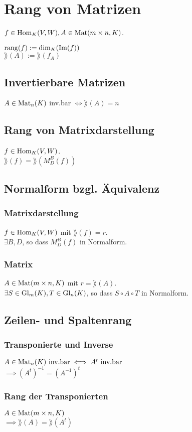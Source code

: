\section*{Rang von Matrizen}

$f \in \operatorname{Hom}_K(V,W), A\in\operatorname{Mat}(m \times n, K)$.

$\operatorname{rang}(f) := \dim_K(\operatorname{Im}(f))$ \\
$\rang(A) := \rang(f_A)$

\subsection*{Invertierbare Matrizen}
$A \in\operatorname{Mat}_n(K)$ inv.bar $\iff \rang(A) = n$

\subsection*{Rang von Matrixdarstellung}
$f\in\operatorname{Hom}_K(V,W)$. \\
$\rang(f) = \rang(M_D^B(f))$

\subsection*{Normalform bzgl. Äquivalenz}

\subsubsection*{Matrixdarstellung}
$f \in\operatorname{Hom}_K(V,W)$ mit $\rang(f)=r$. \\
$\exists B,D$, so dass $M_D^B(f)$ in Normalform.

\subsubsection*{Matrix}
$A\in\operatorname{Mat}(m \times n, K)$ mit $r=\rang(A)$. \\
$\exists S \in \operatorname{Gl}_m(K), T\in\operatorname{Gl}_n(K)$, so dass
$S \circ A \circ T$ in Normalform.

\subsection*{Zeilen- und Spaltenrang}
\subsubsection*{Transponierte und Inverse}
$A\in\operatorname{Mat}_n(K) \text{ inv.bar} \iff A^t \text{ inv.bar}$ \\
$\implies (A^t)^{-1} = (A^{-1})^t$

\subsubsection*{Rang der Transponierten}
$A\in\operatorname{Mat}(m \times n, K)$ \\
$\implies \rang(A) = \rang(A^t)$
